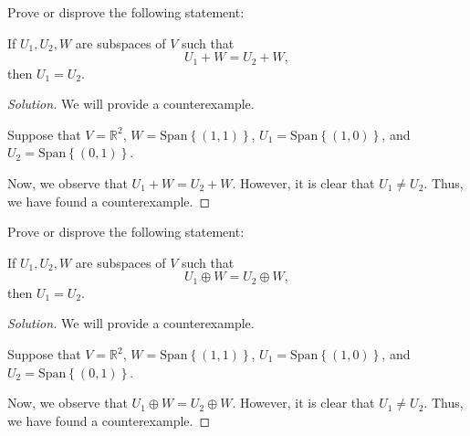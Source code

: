 \documentclass[openany]{book}
\newenvironment{solution}{\begin{proof}[Solution]}{\end{proof}}
\newcommand{\RR}{\mathbb{R}}
\newcommand{\Span}{\mathrm{Span}}
\begin{document}
	\begin{hw}
		Prove or disprove the following statement:
		
		If $U_{1}, U_{2}, W$ are subspaces of $V$ such that
		\begin{equation*}
			U_{1} + W = U_{2} + W,
		\end{equation*}
		then $U_{1} = U_{2}$.
	\end{hw}
	\begin{solution}
		We will provide a counterexample.
		
		Suppose that $V = \RR^{2}$, $W = \Span\left\{  (1,1)\right\}$, $U_{1} = \Span\left\{  (1,0)\right\}$, and $U_{2} = \Span\left\{  (0,1)\right\}$.
		
		Now, we observe that $U_{1} + W = U_{2} + W$. However, it is clear that $U_{1} \neq U_{2}$. Thus, we have found a counterexample.
	\end{solution}

	\begin{hw}
		Prove or disprove the following statement:
		
		If $U_{1}, U_{2}, W$ are subspaces of $V$ such that
		\begin{equation*}
			U_{1} \oplus W = U_{2} \oplus W,
		\end{equation*}
		then $U_{1} = U_{2}$.
	\end{hw}
	\begin{solution}
	We will provide a counterexample.
	
	Suppose that $V = \RR^{2}$, $W = \Span\left\{  (1,1)\right\}$, $U_{1} = \Span\left\{  (1,0)\right\}$, and $U_{2} = \Span\left\{  (0,1)\right\}$.
	
	Now, we observe that $U_{1} \oplus W = U_{2} \oplus W$. However, it is clear that $U_{1} \neq U_{2}$. Thus, we have found a counterexample.
\end{solution}
\end{document}
